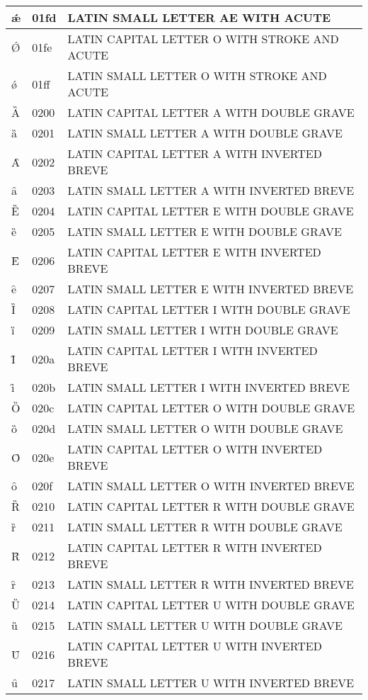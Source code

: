 \documentclass[12pt,letterpaper,openany]{book}
\begin{document}
\begin{center}
\begin{supertabular}{|m{0.25in}|m{0.5in}|m{4in}|}
ǽ & 01fd & LATIN SMALL LETTER AE WITH ACUTE\\\hline
Ǿ & 01fe & LATIN CAPITAL LETTER O WITH STROKE AND ACUTE\\\hline
ǿ & 01ff & LATIN SMALL LETTER O WITH STROKE AND ACUTE\\\hline
Ȁ & 0200 & LATIN CAPITAL LETTER A WITH DOUBLE GRAVE\\\hline
ȁ & 0201 & LATIN SMALL LETTER A WITH DOUBLE GRAVE\\\hline
Ȃ & 0202 & LATIN CAPITAL LETTER A WITH INVERTED BREVE\\\hline
ȃ & 0203 & LATIN SMALL LETTER A WITH INVERTED BREVE\\\hline
Ȅ & 0204 & LATIN CAPITAL LETTER E WITH DOUBLE GRAVE\\\hline
ȅ & 0205 & LATIN SMALL LETTER E WITH DOUBLE GRAVE\\\hline
Ȇ & 0206 & LATIN CAPITAL LETTER E WITH INVERTED BREVE\\\hline
ȇ & 0207 & LATIN SMALL LETTER E WITH INVERTED BREVE\\\hline
Ȉ & 0208 & LATIN CAPITAL LETTER I WITH DOUBLE GRAVE\\\hline
ȉ & 0209 & LATIN SMALL LETTER I WITH DOUBLE GRAVE\\\hline
Ȋ & 020a & LATIN CAPITAL LETTER I WITH INVERTED BREVE\\\hline
ȋ & 020b & LATIN SMALL LETTER I WITH INVERTED BREVE\\\hline
Ȍ & 020c & LATIN CAPITAL LETTER O WITH DOUBLE GRAVE\\\hline
ȍ & 020d & LATIN SMALL LETTER O WITH DOUBLE GRAVE\\\hline
Ȏ & 020e & LATIN CAPITAL LETTER O WITH INVERTED BREVE\\\hline
ȏ & 020f & LATIN SMALL LETTER O WITH INVERTED BREVE\\\hline
Ȑ & 0210 & LATIN CAPITAL LETTER R WITH DOUBLE GRAVE\\\hline
ȑ & 0211 & LATIN SMALL LETTER R WITH DOUBLE GRAVE\\\hline
Ȓ & 0212 & LATIN CAPITAL LETTER R WITH INVERTED BREVE\\\hline
ȓ & 0213 & LATIN SMALL LETTER R WITH INVERTED BREVE\\\hline
Ȕ & 0214 & LATIN CAPITAL LETTER U WITH DOUBLE GRAVE\\\hline
ȕ & 0215 & LATIN SMALL LETTER U WITH DOUBLE GRAVE\\\hline
Ȗ & 0216 & LATIN CAPITAL LETTER U WITH INVERTED BREVE\\\hline
ȗ & 0217 & LATIN SMALL LETTER U WITH INVERTED BREVE\\\hline

\end{supertabular}
\end{center}
\end{document}
